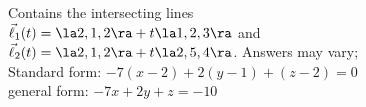 {Contains the intersecting lines\\
$\vec\ell_1(t) = \la 2,1,2\ra + t\la 1,2,3\ra$ and \\
$\vec\ell_2(t) = \la 2,1,2\ra + t\la 2,5,4\ra$.
}
{Answers may vary;\\
Standard form: $-7(x-2)+2(y-1)+(z-2)=0$\\
general form: $-7x+2y+z=-10$
}

